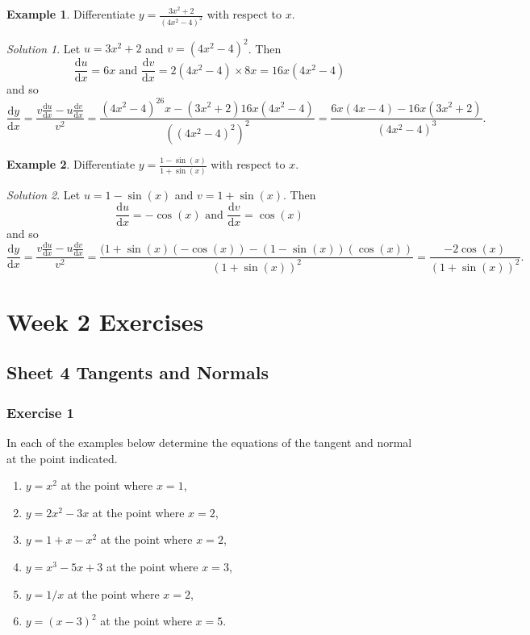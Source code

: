 \documentclass[
  english,
  11pt,
  oneside]{book}
\providecommand{\tightlist}{%
  \setlength{\itemsep}{0pt}\setlength{\parskip}{0pt}}
\newcommand{\slide}{}
\theoremstyle{definition}
\theoremstyle{definition}
\newtheorem{example}{Example}[chapter]
\theoremstyle{definition}
\theoremstyle{definition}
\theoremstyle{remark}
\newtheorem*{solution}{Solution}
\begin{document}
\begin{example}
Differentiate \(y=\frac{3x^2+2}{(4x^2-4)^2}\) with respect to \(x\).
\end{example}

\begin{solution}
Let \(u = 3x^2+2\) and \(v = (4x^2-4)^2\).
Then
\[\frac{\mathrm{d} u}{\mathrm{d} x} = 6x\text{ and }\frac{\mathrm{d} v}{\mathrm{d} x} = 2(4x^2-4)\times8x = 16x(4x^2-4)\]
and so
\[\frac{\mathrm{d} y}{\mathrm{d} x} = \frac{v\frac{\mathrm{d} u}{\mathrm{d} x}-u\frac{\mathrm{d} v}{\mathrm{d} x}}{v^2} = \frac{(4x^2-4)^26x - (3x^2+2)16x(4x^2-4)}{((4x^2-4)^2)^2} = \frac{6x(4x-4)-16x(3x^2+2)}{(4x^2-4)^3}.\]
\end{solution}

\slide

\begin{example}
Differentiate \(y=\frac{1-\sin(x)}{1+\sin(x)}\) with respect to \(x\).
\end{example}

\begin{solution}
Let \(u = 1-\sin(x)\) and \(v = 1+\sin(x)\).
Then
\[\frac{\mathrm{d} u}{\mathrm{d} x} = -\cos(x)\text{ and }\frac{\mathrm{d} v}{\mathrm{d} x} = \cos(x)\]
and so
\[\frac{\mathrm{d} y}{\mathrm{d} x} = \frac{v\frac{\mathrm{d} u}{\mathrm{d} x}-u\frac{\mathrm{d} v}{\mathrm{d} x}}{v^2} = \frac{(1+\sin(x)(-\cos(x))-(1-\sin(x))(\cos(x))}{(1+\sin(x))^2} = \frac{-2\cos(x)}{(1+\sin(x))^2}.\]
\end{solution}

\chapter*{Week 2 Exercises}\label{week-2-exercises}

\section{Sheet 4 Tangents and Normals}\label{sheet-4-tangents-and-normals}

\subsection*{Exercise 1}\label{exercise-1-1}

In each of the examples below determine the equations of the tangent and normal at the point indicated.

\begin{enumerate}
\def\labelenumi{\alph{enumi}.}
\tightlist
\item
  \(y=x^2\) at the point where \(x=1\),
\item
  \(y=2x^2-3x\) at the point where \(x=2\),
\item
  \(y=1+x-x^2\) at the point where \(x=2\),
\item
  \(y=x^3-5x+3\) at the point where \(x=3\),
\item
  \(y=1/x\) at the point where \(x=2\),
\item
  \(y=(x-3)^2\) at the point where \(x=5\).
\end{enumerate}
\end{document}
